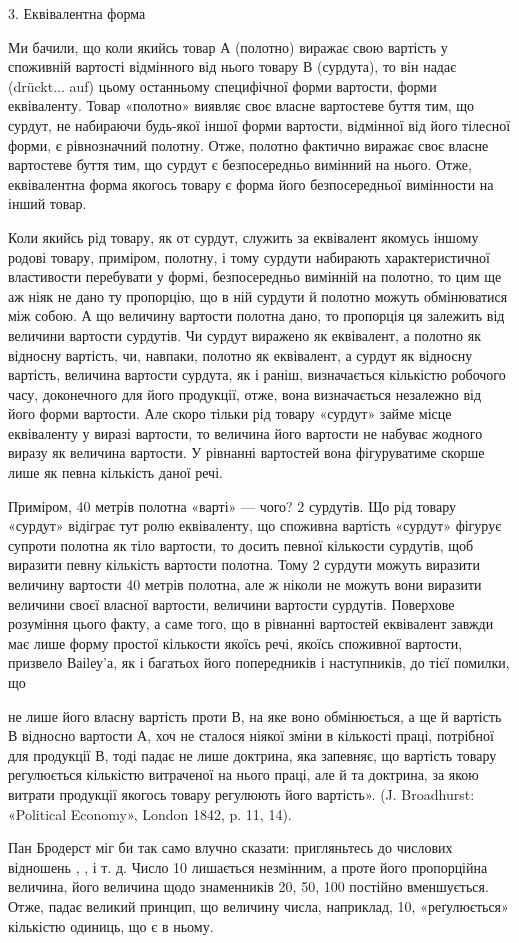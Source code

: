 3. Еквівалентна форма

Ми бачили, що коли якийсь товар А (полотно) виражає свою вартість у споживній вартості відмінного
від нього товару В (сурдута), то він надає (drückt... auf) цьому останньому специфічної форми
вартости, форми еквіваленту. Товар «полотно» виявляє своє власне вартостеве буття тим, що сурдут, не
набираючи будь-якої іншої форми вартости, відмінної від його тілесної форми, є рівнозначний полотну.
Отже, полотно фактично виражає своє власне вартостеве буття тим, що сурдут є безпосередньо вимінний
на нього. Отже, еквівалентна форма якогось товару є форма його безпосередньої вимінности на інший
товар.

Коли якийсь рід товару, як от сурдут, служить за еквівалент якомусь іншому родові товару, приміром,
полотну, і тому сурдути набирають характеристичної властивости перебувати у формі, безпосередньо
вимінній на полотно, то цим ще аж ніяк не дано ту пропорцію, що в ній сурдути й полотно можуть
обмінюватися між собою. А що величину вартости полотна дано, то пропорція ця залежить від величини
вартости сурдутів. Чи сурдут виражено як еквівалент, а полотно як відносну вартість, чи, навпаки,
полотно як еквівалент, а сурдут як відносну вартість, величина вартости сурдута, як і раніш,
визначається кількістю робочого часу, доконечного для його продукції, отже, вона  визначається
незалежно від його форми вартости. Але скоро тільки рід товару «сурдут» займе місце еквіваленту у
виразі вартости, то величина його вартости не набуває жодного виразу як величина вартости. У
рівнанні вартостей вона фігуруватиме скорше лише як певна кількість даної речі.

Приміром, 40 метрів полотна «варті» — чого? 2 сурдутів. Що рід товару «сурдут» відіграє тут ролю
еквіваленту, що споживна вартість «сурдут» фігурує супроти полотна як тіло вартости, то досить
певної кількости сурдутів, щоб виразити певну кількість вартости полотна. Тому 2 сурдути можуть
виразити величину вартости 40 метрів полотна, але ж ніколи не можуть вони виразити величини своєї
власної вартости, величини вартости сурдутів. Поверхове розуміння цього факту, а саме того, що в
рівнанні вартостей еквівалент завжди має лише форму простої кількости якоїсь речі, якоїсь споживної
вартости, призвело Ваіlеу’а, як і багатьох його попередників і наступників, до тієї помилки, що

не лише його власну вартість проти В, на яке воно обмінюється, а ще й вартість В відносно вартости
А, хоч не сталося ніякої зміни в кількості праці, потрібної для продукції В, тоді падає не лише
доктрина, яка запевняє, що вартість товару регулюється кількістю витраченої на нього праці, але й та
доктрина, за якою витрати продукції якогось товару регулюють його вартість». (J. Broadhurst:
«Political Economy», London 1842, p. 11, 14).

Пан Бродерст міг би так само влучно сказати: пригляньтесь до числових відношень , ,
і т. д. Число 10 лишається незмінним, а проте його пропорційна величина, його величина щодо
знаменників 20, 50, 100 постійно вменшується. Отже, падає великий принцип, що величину числа,
наприклад, 10, «реґулюється» кількістю одиниць, що є в ньому.
